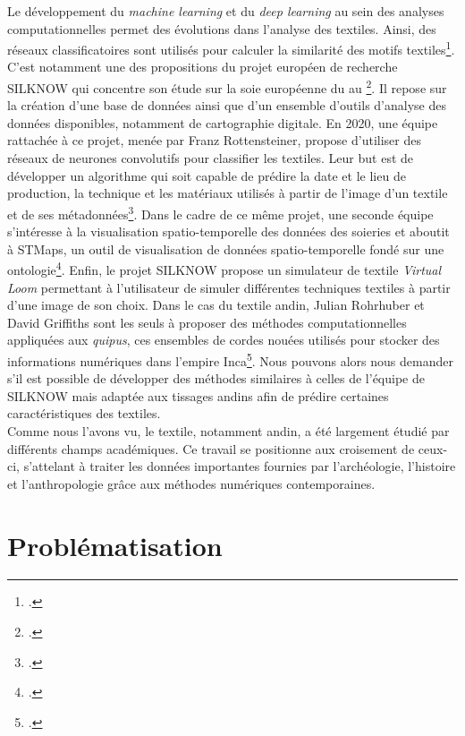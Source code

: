 Le développement du \textit{machine learning} et du \textit{deep learning} au sein des analyses computationnelles permet des évolutions dans l'analyse des textiles. Ainsi, des réseaux classificatoires sont utilisés pour calculer la similarité des motifs textiles\footcite{xiangFabricImageRetrieval2019}. C'est notamment une des propositions du projet européen de recherche \textsc{SILKNOW} qui concentre son étude sur la soie européenne du  au \footcite{SILKNOWSILK}. Il repose sur la création d'une base de données ainsi que d'un ensemble d'outils d'analyse des données disponibles, notamment de cartographie digitale. En 2020, une équipe rattachée à ce projet, menée par Franz Rottensteiner, propose d'utiliser des réseaux de neurones convolutifs pour classifier les textiles. Leur but est de développer un algorithme qui soit capable de prédire la date et le lieu de production, la technique et les matériaux utilisés à partir de l'image d'un textile et de ses métadonnées\footcite{clermontAssessingSemanticSimilarity2020}. Dans le cadre de ce même projet, une seconde équipe s'intéresse à la visualisation spatio-temporelle des données des soieries et aboutit à STMaps, \og un outil de visualisation de données spatio-temporelle fondé sur une ontologie\fg\footcite{sevillaMultiPurposeOntologyBasedVisualization2021}. Enfin, le projet \textsc{SILKNOW} propose un simulateur de textile \textit{Virtual Loom} permettant à l'utilisateur de simuler différentes techniques textiles à partir d'une image de son choix. Dans le cas du textile andin, Julian Rohrhuber et David Griffiths sont les seuls à proposer des méthodes computationnelles appliquées aux \textit{quipus}, ces ensembles de cordes nouées utilisés pour stocker des informations numériques dans l'empire Inca\footcite{rohrhuberCodingKnots2017}. Nous pouvons alors nous demander s'il est possible de développer des méthodes similaires à celles de l'équipe de SILKNOW mais adaptée aux tissages andins afin de prédire certaines caractéristiques des textiles.\\

Comme nous l'avons vu, le textile, notamment andin, a été largement étudié par différents champs académiques. Ce travail se positionne aux croisement de ceux-ci, s'attelant à traiter les données importantes fournies par l'archéologie, l'histoire et l'anthropologie grâce aux méthodes numériques contemporaines.

\section*{Problématisation}

